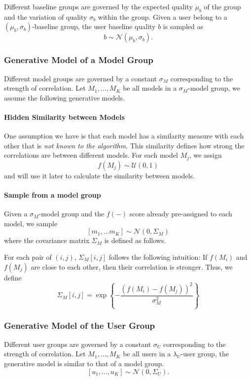 \documentclass[letterpaper]{vldb}
\begin{document}
Different baseline groups are governed by the expected quality $\mu_b$ of the group
and the variation of quality $\sigma_b$ within the group. Given a user
belong to a $(\mu_b, \sigma_b)$-baseline group, the user baseline quality 
$b$ is sampled as
\[
b \sim \mathcal{N}(\mu_b, \sigma_b).
\]

\subsubsection{Generative Model of a Model Group}

Different model groups are governed by a constant $\sigma_M$ corresponding to
the strength of correlation. Let ${M_1,...,M_K}$ be all models in a
$\sigma_M$-model group, we assume the following generative models.

\paragraph*{Hidden Similarity between Models}

One assumption we have is that each model has a similarity measure with each
other that is {\em not known to the algorithm}. This similarity defines how strong
the correlations are between different models. For each 
model $M_j$, we assign 
\[
f(M_j) \sim \mathcal{\mathcal{U}}(0, 1)
\]
and will use it later to calculate the similarity between models.

\paragraph*{Sample from a model group}

Given a $\sigma_M$-model group and the $f(-)$ score already pre-assigned to each
model, we sample 
\[
[m_1,...m_K] \sim \mathcal{N}(0, \Sigma_M)
\]
where the covariance matrix $\Sigma_M$ is defined as follows.

For each pair of $(i,j)$, $\Sigma_M[i,j]$ follows the following intuition:
If $f(M_i)$ and $f(M_j)$ are close to each other, then their correlation
is stronger. Thus, we define
\[
\Sigma_M[i,j] = \exp \left\{-\frac{(f(M_i) - f(M_j))^2}{\sigma_M^2} \right\}
\]

\subsubsection{Generative Model of the User Group}

Different user groups are governed by a constant $\sigma_U$ corresponding to
the strength of correlation. Let ${M_1,...,M_K}$ be all users in a
$\lambda_U$-user group, the generative model is similar to that of a model group.
\[
[u_1,...,u_K] \sim \mathcal{N}(0, \Sigma_U).
\]
\end{document}

